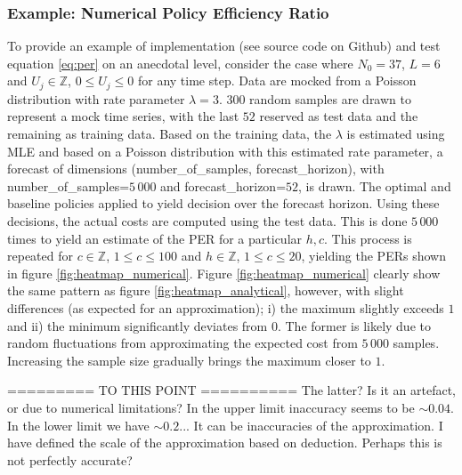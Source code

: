\documentclass[a4paper,12pt]{article}
\begin{document}
	
	\subsubsection{Example: Numerical Policy Efficiency Ratio}
	To provide an example of implementation (see source code on Github) and test equation \eqref{eq:per} on an anecdotal level, consider the case where $N_0=37$, $L =6$ and $U_j\in \mathbb{Z}$, $0\leq U_j\leq 0$ for any time step. Data are mocked from a Poisson distribution with rate parameter $\lambda =3$. $300$ random samples are drawn to represent a mock time series, with the last $52$ reserved as test data and the remaining as training data. Based on the training data, the $\lambda$ is estimated using MLE and based on a Poisson distribution with this estimated rate parameter, a forecast of dimensions (number\_of\_samples, forecast\_horizon), with number\_of\_samples=$5\,000$ and forecast\_horizon=$52$, is drawn. The optimal and baseline policies applied to yield decision over the forecast horizon. Using these decisions, the actual costs are computed using the test data. This is done $5\,000$ times to yield an estimate of the PER for a particular $h,c$. This process is repeated for $c\in \mathbb{Z}$, $1\leq c\leq 100$ and $h\in \mathbb{Z}$, $1\leq c\leq 20$, yielding the PERs shown in figure \ref{fig:heatmap_numerical}. Figure \ref{fig:heatmap_numerical} clearly show the same pattern as figure \ref{fig:heatmap_analytical}, however, with slight differences (as expected for an approximation); i) the maximum slightly exceeds $1$ and ii) the minimum significantly deviates from $0$. The former is likely due to random fluctuations from approximating the expected cost from $5\, 000$ samples. Increasing the sample size gradually brings the maximum closer to $1$. 
	
	========= TO THIS POINT ==========
	{\color{red} The latter? Is it an artefact, or due to numerical limitations? In the upper limit inaccuracy seems to be $\sim 0.04$. In the lower limit we have $\sim 0.2$... It can be inaccuracies of the approximation. I have defined the scale of the approximation based on deduction. Perhaps this is not perfectly accurate?}
	
\end{document}
